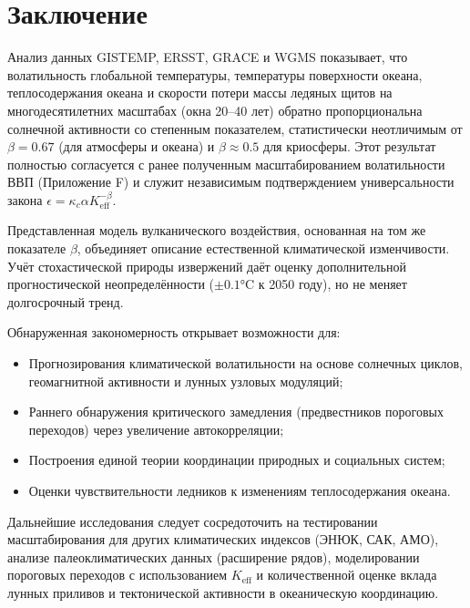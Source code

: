 \documentclass[12pt,a4paper]{article}
\newcommand{\Keff}{K_{\mathrm{eff}}}
\newcommand{\kappac}{\kappa_c}
\newcommand{\be}{\beta}
\begin{document}
	\section{Заключение}
	
	Анализ данных GISTEMP, ERSST, GRACE и WGMS показывает, что волатильность глобальной температуры, температуры поверхности океана, теплосодержания океана и скорости потери массы ледяных щитов на многодесятилетних масштабах (окна 20–40 лет) обратно пропорциональна солнечной активности со степенным показателем, статистически неотличимым от \(\be = 0.67\) (для атмосферы и океана) и \(\be \approx 0.5\) для криосферы. Этот результат полностью согласуется с ранее полученным масштабированием волатильности ВВП (Приложение F) и служит независимым подтверждением универсальности закона \(\epsilon = \kappac \alpha \Keff^{-\be}\).
	
	Представленная модель вулканического воздействия, основанная на том же показателе \(\beta\), объединяет описание естественной климатической изменчивости. Учёт стохастической природы извержений даёт оценку дополнительной прогностической неопределённости (\(\pm0.1\)°C к 2050 году), но не меняет долгосрочный тренд.
	
	Обнаруженная закономерность открывает возможности для:
	\begin{itemize}
		\item Прогнозирования климатической волатильности на основе солнечных циклов, геомагнитной активности и лунных узловых модуляций;
		\item Раннего обнаружения критического замедления (предвестников пороговых переходов) через увеличение автокорреляции;
		\item Построения единой теории координации природных и социальных систем;
		\item Оценки чувствительности ледников к изменениям теплосодержания океана.
	\end{itemize}
	
	Дальнейшие исследования следует сосредоточить на тестировании масштабирования для других климатических индексов (ЭНЮК, САК, АМО), анализе палеоклиматических данных (расширение рядов), моделировании пороговых переходов с использованием \(\Keff\) и количественной оценке вклада лунных приливов и тектонической активности в океаническую координацию.
	
\end{document}
